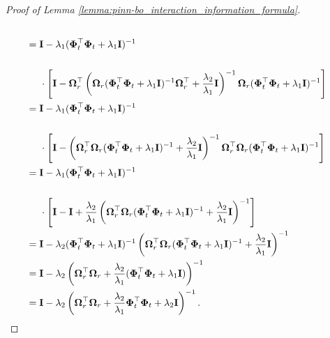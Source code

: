 \begin{proof}[Proof of Lemma \ref{lemma:pinn-bo_interaction_information_formula}]
\begin{align*}
            \\
            &  = \mathbf{I} -  \lambda_1(\boldsymbol{\Phi}_t^\top\boldsymbol{\Phi}_t+\lambda_1 \mathbf{I})^{-1} \\ \notag
            \\ 
            & \;\;\;\;\;    \cdot \left[\mathbf{I} - \boldsymbol{\Omega}_r^\top \left(\boldsymbol{\Omega}_r(\boldsymbol{\Phi}_t^\top \boldsymbol{\Phi}_t+ \lambda_1\mathbf{I})^{-1}\boldsymbol{\Omega}_r^\top+\frac{\lambda_2} {\lambda_1} \mathbf{I}\right)^{-1} \boldsymbol{\Omega}_r (\boldsymbol{\Phi}_t^\top\boldsymbol{\Phi}_t+\lambda_1 \mathbf{I})^{-1} \right]
            \\
            & = \mathbf{I} -  \lambda_1(\boldsymbol{\Phi}_t^\top\boldsymbol{\Phi}_t+\lambda_1 \mathbf{I})^{-1} \\ \notag 
            \\
            & \;\;\;\;\; \cdot \left[\mathbf{I} -  \left(\boldsymbol{\Omega}_r^\top\boldsymbol{\Omega}_r(\boldsymbol{\Phi}_t^\top \boldsymbol{\Phi}_t+ \lambda_1\mathbf{I})^{-1}+\frac{\lambda_2} {\lambda_1} \mathbf{I}\right)^{-1} \boldsymbol{\Omega}_r^\top\boldsymbol{\Omega}_r (\boldsymbol{\Phi}_t^\top\boldsymbol{\Phi}_t+\lambda_1 \mathbf{I})^{-1}\right] \\ 
            & = \mathbf{I} -  \lambda_1(\boldsymbol{\Phi}_t^\top\boldsymbol{\Phi}_t+\lambda_1 \mathbf{I})^{-1} \\ \notag 
            \\
            & \;\;\;\;\; \cdot \left[\mathbf{I} -  \mathbf{I} + \frac{\lambda_2}{\lambda_1}\left(\boldsymbol{\Omega}_r^\top\boldsymbol{\Omega}_r(\boldsymbol{\Phi}_t^\top \boldsymbol{\Phi}_t+ \lambda_1\mathbf{I})^{-1}+\frac{\lambda_2} {\lambda_1} \mathbf{I}\right)^{-1} \right] \\ 
            & = \mathbf{I} - \lambda_2 (\boldsymbol{\Phi}_t^\top \boldsymbol{\Phi}_t+ \lambda_1\mathbf{I})^{-1}\left(\boldsymbol{\Omega}_r^\top\boldsymbol{\Omega}_r(\boldsymbol{\Phi}_t^\top \boldsymbol{\Phi}_t+ \lambda_1\mathbf{I})^{-1}+\frac{\lambda_2} {\lambda_1} \mathbf{I}\right)^{-1} \\
            & =\mathbf{I} - \lambda_2 \left(\boldsymbol{\Omega}_r^\top\boldsymbol{\Omega}_r+\frac{\lambda_2} {\lambda_1} (\boldsymbol{\Phi}_t^\top \boldsymbol{\Phi}_t+ \lambda_1\mathbf{I})\right)^{-1} \\
            & =\mathbf{I} - \lambda_2 \left(\boldsymbol{\Omega}_r^\top\boldsymbol{\Omega}_r+\frac{\lambda_2} {\lambda_1} \boldsymbol{\Phi}_t^\top \boldsymbol{\Phi}_t+ \lambda_2 \mathbf{I}\right)^{-1}. 

\end{align*}
\end{proof}
